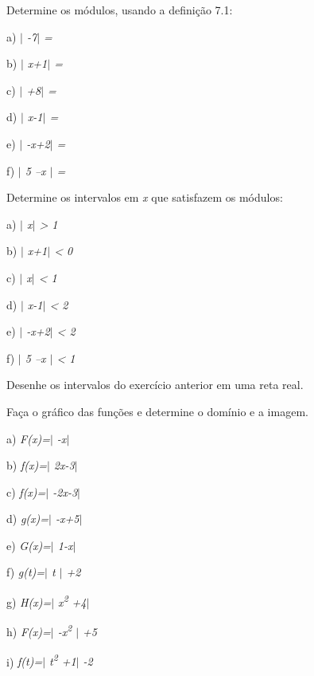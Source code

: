 \begin{exercicios}

	\exitem{} Determine os módulos, usando a definição 7.1:

\begin{multicols}{3}
	a) \textit{$ \vert $ -7$ \vert $  = }

	b) \textit{$ \vert $ x+1$ \vert $  = }
	
	c) \textit{$ \vert $ +8$ \vert $  = }
	
	d) \textit{$ \vert $ x-1$ \vert $  = }
	
	e) \textit{$ \vert $ -x+2$ \vert $  = }

	f) \textit{$ \vert $ 5 –x $ \vert $  = }
\end{multicols}

	\exitem{} Determine os intervalos em \textit{x} que satisfazem os módulos:

\begin{multicols}{3}
	a) \textit{$ \vert $ x$ \vert $  > 1}

	b) \textit{$ \vert $ x+1$ \vert $  < 0}
	
	c) \textit{$ \vert $ x$ \vert $  < 1}

	d) \textit{$ \vert $ x-1$ \vert $  < 2} 
	
	e) \textit{$ \vert $ -x+2$ \vert $  < 2}
	
	f) \textit{$ \vert $ 5 –x $ \vert $  < 1}
\end{multicols}

	\exitem{} Desenhe os intervalos do exercício anterior em uma reta real.

	\exitem{} Faça o gráfico das funções e determine o domínio e a imagem.

\begin{multicols}{3}

	a) \textit{F(x)=$ \vert $ -x$ \vert $}

	b) \textit{ f(x)=$ \vert $ 2x-3$ \vert $ }
	
	c) \textit{f(x)=$ \vert $ -2x-3$ \vert $ } 
	
	d) \textit{g(x)=$ \vert $ -x+5$ \vert $}
	
	e) \textit{G(x)=$ \vert $ 1-x$ \vert $ }

	f) \textit{g(t)=$ \vert $  t $ \vert $  +2}

	g) \textit{H(x)=$ \vert $  x\textsuperscript{2 }+4$ \vert $}
	
	h) \textit{F(x)=$ \vert $  -x\textsuperscript{2 }$ \vert $ +5}

	i) \textit{f(t)=$ \vert $  t\textsuperscript{2} +1$ \vert $ -2}
\end{multicols}


\end{exercicios}
